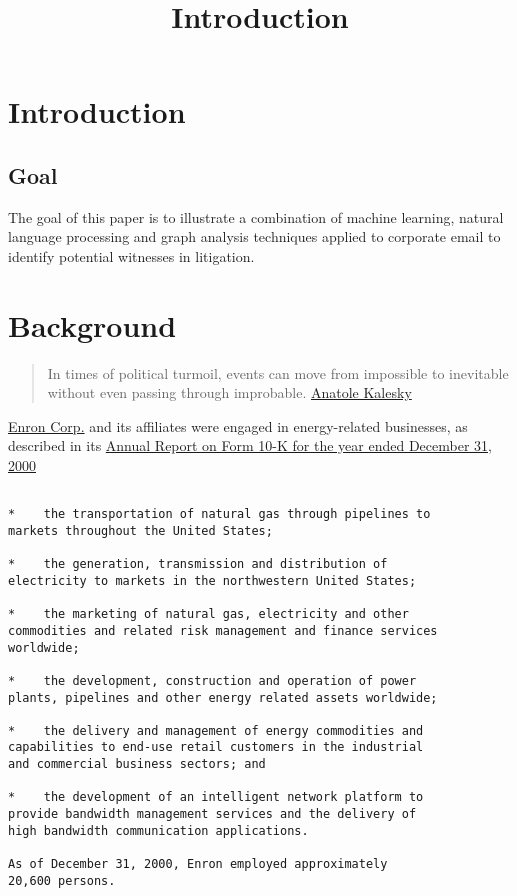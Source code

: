\documentclass[]{article}
\title{Introduction}
\author{}
\date{}
\begin{document}
\maketitle

\hypertarget{introduction}{%
\section{Introduction}\label{introduction}}

\hypertarget{goal}{%
\subsection{Goal}\label{goal}}

The goal of this paper is to illustrate a combination of machine
learning, natural language processing and graph analysis techniques
applied to corporate email to identify potential witnesses in
litigation.

\hypertarget{background}{%
\section{Background}\label{background}}

\begin{quote}
In times of political turmoil, events can move from impossible to
inevitable without even passing through improbable.
\href{https://www.project-syndicate.org/commentary/canceling-brexit-becoming-inevitable-by-anatole-kaletsky-2018-12}{Anatole
Kalesky}
\end{quote}

\href{https://en.wikipedia.org/wiki/Enron}{Enron Corp.} and its
affiliates were engaged in energy-related businesses, as described in
its
\href{https://www.sec.gov/Archives/edgar/data/1024401/000102440101500010/ene10-k.txt}{Annual
Report on Form 10-K for the year ended December 31, 2000}

\begin{Verbatim}[frame=single]

*    the transportation of natural gas through pipelines to
markets throughout the United States;

*    the generation, transmission and distribution of
electricity to markets in the northwestern United States;

*    the marketing of natural gas, electricity and other
commodities and related risk management and finance services
worldwide;

*    the development, construction and operation of power
plants, pipelines and other energy related assets worldwide;

*    the delivery and management of energy commodities and
capabilities to end-use retail customers in the industrial
and commercial business sectors; and

*    the development of an intelligent network platform to
provide bandwidth management services and the delivery of
high bandwidth communication applications.

As of December 31, 2000, Enron employed approximately
20,600 persons.

    \end{Verbatim}
\end{document}
